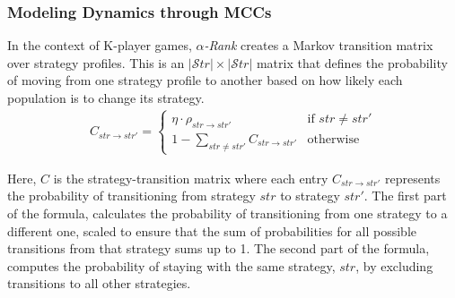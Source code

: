    \subsubsection{Modeling Dynamics through MCCs}
    
        In the context of K-player games, \emph{$\alpha$-Rank} creates a Markov transition matrix over strategy profiles. This is an $|\mathcal{S}tr| \times |\mathcal{S}tr|$ matrix that defines the probability of moving from one strategy profile to another based on how likely each population is to change its strategy.
        \begin{eqnarray}
            C_{str \to str'} = 
            \begin{cases} 
                \eta \cdot \rho_{str \to str'} & \text{if } str \neq str' \\ 
                1 - \sum_{str \neq str'} C_{str \to str'} & \text{otherwise}
            \end{cases} 
            \label{eq:transition_matrix_entry}
        \end{eqnarray}

        \noindent
        Here, $C$ is the strategy-transition matrix where each entry $C_{str \to str'}$ represents the probability of transitioning from strategy $str$ to strategy $str'$. The first part of the formula, calculates the probability of transitioning from one strategy to a different one, scaled to ensure that the sum of probabilities for all possible transitions from that strategy sums up to 1. The second part of the formula, computes the probability of staying with the same strategy, $str$, by excluding transitions to all other strategies.\tinydouble

